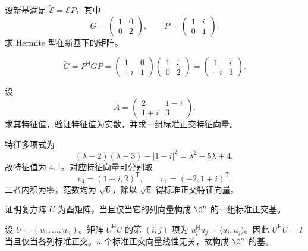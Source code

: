 \begin{exercise}[level=standard]
设新基满足 $\widetilde{\mathcal E}=\mathcal EP$，其中
\[
G=\begin{pmatrix}1&0\\0&2\end{pmatrix},\qquad
P=\begin{pmatrix}1&i\\0&1\end{pmatrix}.
\]
求 Hermite 型在新基下的矩阵。
\begin{solution}
\[
\widetilde G=P^{\mathsf H}GP
=\begin{pmatrix}1&0\\-i&1\end{pmatrix}
\begin{pmatrix}1&i\\0&2\end{pmatrix}
=\begin{pmatrix}1&i\\-i&3\end{pmatrix}.
\]
\end{solution}
\end{exercise}

\begin{exercise}[level=standard]
设
\[
A=\begin{pmatrix}2&1-i\\1+i&3\end{pmatrix}.
\]
求其特征值，验证特征值为实数，并求一组标准正交特征向量。
\begin{solution}
特征多项式为
\[
(\lambda-2)(\lambda-3)-|1-i|^2
=\lambda^2-5\lambda+4,
\]
故特征值为 $4,1$。对应特征向量可分别取
\[
v_4=(1-i,2)^{\mathsf T},
\qquad
v_1=(-2,1+i)^{\mathsf T}.
\]
二者内积为零，范数均为 $\sqrt6$，除以 $\sqrt6$ 得标准正交特征向量。
\end{solution}
\end{exercise}

\begin{exercise}[level=standard]
证明复方阵 $U$ 为酉矩阵，当且仅当它的列向量构成 $\C^n$ 的一组标准正交基。
\begin{solution}
设 $U=(u_1,\ldots,u_n)$。矩阵 $U^{\mathsf H}U$ 的第 $(i,j)$ 项为
$u_i^{\mathsf H}u_j=\langle u_i,u_j\rangle$。因此
$U^{\mathsf H}U=I$ 当且仅当各列标准正交。$n$ 个标准正交向量线性无关，故构成 $\C^n$ 的基。
\end{solution}
\end{exercise}

